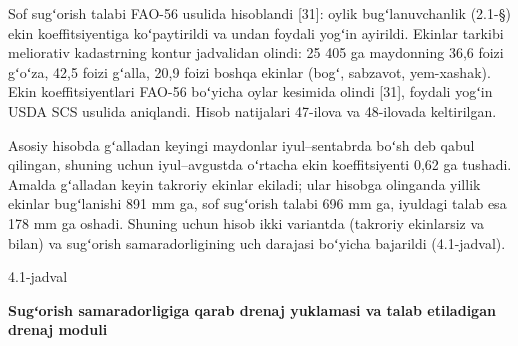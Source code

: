 \documentclass[14pt,a4paper,oneside]{extreport}
\newcommand{\oakilovanom}[1]{{\centering\setstretch{1}\bfseries #1\par}\nopagebreak\vspace{2pt}}
\newcommand{\oakjadvalnum}[1]{\par\Needspace{12\baselineskip}\vspace{2pt}\noindent\hfill #1\par\nopagebreak}
\begin{document}
Sof sugʻorish talabi FAO-56 usulida hisoblandi {[}31{]}: oylik
bugʻlanuvchanlik (2.1-§) ekin koeffitsiyentiga koʻpaytirildi va undan
foydali yogʻin ayirildi. Ekinlar tarkibi meliorativ kadastrning kontur
jadvalidan olindi: 25 405 ga maydonning 36,6 foizi gʻoʻza, 42,5 foizi
gʻalla, 20,9 foizi boshqa ekinlar (bogʻ, sabzavot, yem-xashak). Ekin
koeffitsiyentlari FAO-56 boʻyicha oylar kesimida olindi {[}31{]},
foydali yogʻin USDA SCS usulida aniqlandi. Hisob natijalari 47-ilova va
48-ilovada keltirilgan.

Asosiy hisobda gʻalladan keyingi maydonlar iyul--sentabrda boʻsh deb
qabul qilingan, shuning uchun iyul--avgustda oʻrtacha ekin
koeffitsiyenti 0,62 ga tushadi. Amalda gʻalladan keyin takroriy ekinlar
ekiladi; ular hisobga olinganda yillik ekinlar bugʻlanishi 891 mm ga,
sof sugʻorish talabi 696 mm ga, iyuldagi talab esa 178 mm ga oshadi.
Shuning uchun hisob ikki variantda (takroriy ekinlarsiz va bilan) va
sugʻorish samaradorligining uch darajasi boʻyicha bajarildi
(4.1-jadval).

\oakjadvalnum{4.1-jadval}

\oakilovanom{\textbf{Sugʻorish samaradorligiga qarab drenaj yuklamasi va talab
etiladigan drenaj moduli}}
\end{document}

